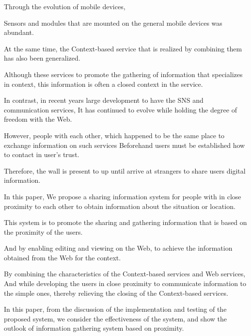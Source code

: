 \begin{eabstract}

Through the evolution of mobile devices,

Sensors and modules that are mounted on the general mobile devices was abundant.

%
At the same time, the Context-based service that is realized by combining them has also been generalized.

Although these services to promote the gathering of information that specializes in context,
this information is often a closed context in the service.

In contrast, in recent years large development to have the SNS and communication services,
It has continued to evolve while holding the degree of freedom with the Web.

However, people with each other, which happened to be the same place to exchange information on such services
Beforehand users must be established how to contact in user's trust.

Therefore, the wall is present to up until arrive at strangers to share users digital information.

In this paper,
We propose a sharing information system for people with in close proximity to each other to obtain information about the situation or location.

This system is to promote the sharing and gathering information
that is based on the proximity of the users.

And by enabling editing and viewing on the Web,
to achieve the information obtained from the Web for the context.

By combining the characteristics of the Context-based services and Web services,
And while developing the users in close proximity
to communicate information to the simple ones,
thereby relieving the closing of the Context-based services.

In this paper,
from the discussion of the implementation and testing of the proposed system,
we consider the effectiveness of the system,
and show the outlook of information gathering system based on proximity.

\end{eabstract}
